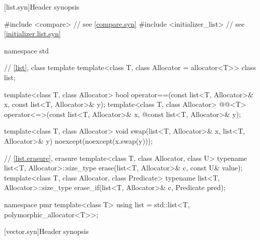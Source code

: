 [list.syn]{Header  synopsis}

%
\begin{codeblock}
#include <compare>              // see \ref{compare.syn}
#include <initializer_list>     // see \ref{initializer.list.syn}

namespace std {
  // \ref{list}, class template 
  template<class T, class Allocator = allocator<T>> class list;

  template<class T, class Allocator>
    bool operator==(const list<T, Allocator>& x, const list<T, Allocator>& y);
  template<class T, class Allocator>
    @@<T> operator<=>(const list<T, Allocator>& x,
    @\itcorr@                                      const list<T, Allocator>& y);

  template<class T, class Allocator>
    void swap(list<T, Allocator>& x, list<T, Allocator>& y)
      noexcept(noexcept(x.swap(y)));

  // \ref{list.erasure}, erasure
  template<class T, class Allocator, class U>
    typename list<T, Allocator>::size_type
      erase(list<T, Allocator>& c, const U& value);
  template<class T, class Allocator, class Predicate>
    typename list<T, Allocator>::size_type
      erase_if(list<T, Allocator>& c, Predicate pred);

  namespace pmr {
    template<class T>
      using list = std::list<T, polymorphic_allocator<T>>;
  }
}
\end{codeblock}

[vector.syn]{Header  synopsis}

